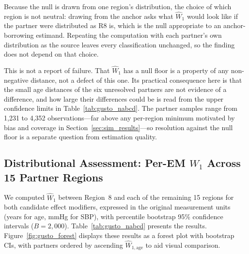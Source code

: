\documentclass[AMA,Times1COL]{WileyNJDv5}
\begin{document}
Because the null is drawn from one region's distribution, the choice of which region is not neutral: drawing from the anchor asks what $\widehat{W}_1$ would look like if the partner were distributed as R8 is, which is the null appropriate to an anchor-borrowing estimand. Repeating the computation with each partner's own distribution as the source leaves every classification unchanged, so the finding does not depend on that choice.

This is not a report of failure. That $\widehat{W}_1$ has a null floor is a property of any non-negative distance, not a defect of this one. Its practical consequence here is that the small age distances of the six unresolved partners are not evidence of a difference, and how large their differences could be is read from the upper confidence limits in Table~\ref{tab:gusto_nabcd}. The partner samples range from 1{,}231 to 4{,}352 observations---far above any per-region minimum motivated by bias and coverage in Section~\ref{sec:sim_results}---so resolution against the null floor is a separate question from estimation quality.

\subsection{Distributional Assessment: Per-EM $W_1$ Across 15 Partner Regions}\label{sec:app_nabcd}

We computed $\widehat{W}_1$ between Region~8 and each of the remaining 15 regions for both candidate effect modifiers, expressed in the original measurement units (years for age, mmHg for SBP), with percentile bootstrap 95\% confidence intervals ($B = 2{,}000$). Table~\ref{tab:gusto_nabcd} presents the results. Figure~\ref{fig:gusto_forest} displays these results as a forest plot with bootstrap CIs, with partners ordered by ascending $\widehat{W}_{1,\text{age}}$ to aid visual comparison.
\end{document}
